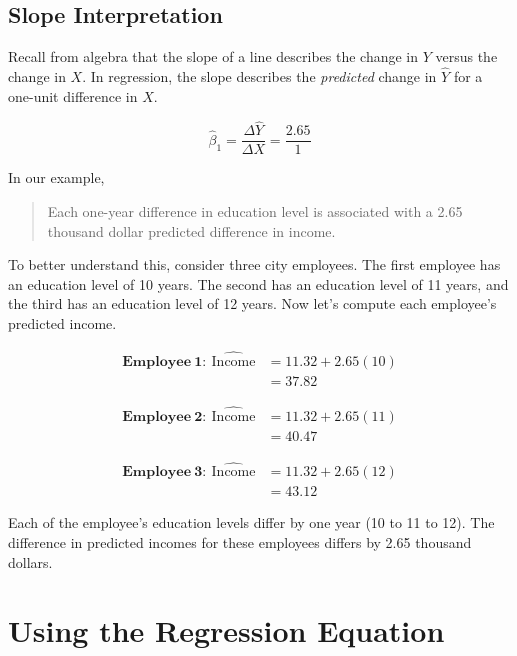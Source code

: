 \documentclass[]{book}
\theoremstyle{definition}
\theoremstyle{definition}
\theoremstyle{definition}
\theoremstyle{remark}
\begin{document}
\hypertarget{slope-interpretation}{%
\subsection{Slope Interpretation}\label{slope-interpretation}}

Recall from algebra that the slope of a line describes the change in
\(Y\) versus the change in \(X\). In regression, the slope describes the
\emph{predicted} change in \(\hat{Y}\) for a one-unit difference in
\(X\).

\[
\hat{\beta}_1 = \frac{\Delta\hat{Y}}{\Delta X} = \frac{2.65}{1}
\]

In our example,

\begin{quote}
Each one-year difference in education level is associated with a 2.65
thousand dollar predicted difference in income.
\end{quote}

To better understand this, consider three city employees. The first
employee has an education level of 10 years. The second has an education
level of 11 years, and the third has an education level of 12 years. Now
let's compute each employee's predicted income.

\[
\begin{split}
\mathbf{Employee~1:~}\hat{\mathrm{Income}} &= 11.32 + 2.65(10) \\
&= 37.82
\end{split}
\]

\[
\begin{split}
\mathbf{Employee~2:~}\hat{\mathrm{Income}} &= 11.32 + 2.65(11) \\
&= 40.47
\end{split}
\]

\[
\begin{split}
\mathbf{Employee~3:~}\hat{\mathrm{Income}} &= 11.32 + 2.65(12) \\
&= 43.12
\end{split}
\]

Each of the employee's education levels differ by one year (10 to 11 to
12). The difference in predicted incomes for these employees differs by
2.65 thousand dollars.

\hypertarget{using-the-regression-equation}{%
\section{Using the Regression
Equation}\label{using-the-regression-equation}}
\end{document}

